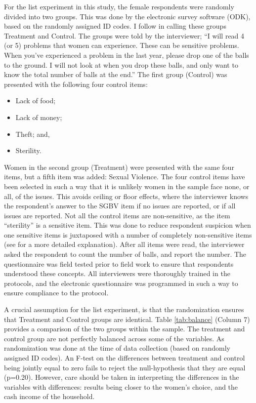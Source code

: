 \documentclass[10pt,a4paper,abstract=on]{scrartcl} %
\begin{document}
For the list experiment in this study, the female respondents were randomly divided into two groups. This was done by the electronic survey software (ODK), based on the randomly assigned ID codes. I follow \cite{Imai2011} in calling these groups Treatment and Control. The groups were told by the interviewer; ``I will read 4 (or 5) problems that women can experience. These can be sensitive problems. When you've experienced a problem in the last year, please drop one of the balls to the ground. I will not look at when you drop these balls, and only want to know the total number of balls at the end.'' The first group (Control) was presented with the following four control items:
\begin{itemize}
	\item Lack of food;
	\item Lack of money;
	\item Theft; and,
	\item Sterility. %
\end{itemize}

Women in the second group (Treatment) were presented with the same four items, but a fifth item was added: Sexual Violence.  The four control items have been selected in such a way that it is unlikely women in the sample face none, or all, of the issues. This avoids ceiling or floor effects, where the interviewer knows the respondent's answer to the SGBV item if no issues are reported, or if all issues are reported. Not all the control items are non-sensitive, as the item ``sterility'' is a sensitive item. This was done to reduce respondent suspicion when one sensitive items is juxtaposed with a number of completely non-sensitive items (see \citet{Chuang2019} for a more detailed explanation). After all items were read, the interviewer asked the respondent to count the number of balls, and report the number. The questionnaire was field tested prior to field work to ensure that respondents understood these concepts. All interviewers were thoroughly trained in the protocols, and the electronic questionnaire was programmed in such a way to ensure compliance to the protocol.

A crucial assumption for the list experiment, is that the randomization ensures that Treatment and Control groups are identical. Table \ref{tab:balance} (Column 7) provides a comparison of the two groups within the sample. The treatment and control group are not perfectly balanced across some of the variables. As randomization was done at the time of data collection (based on randomly assigned ID codes). An F-test on the differences between treatment and control being jointly equal to zero fails to reject the null-hypothesis that they are equal (p=0.20). However, care should be taken in interpreting the differences in the variables with differences: results being closer to the women's choice, and the cash income of the household. 
\end{document}
